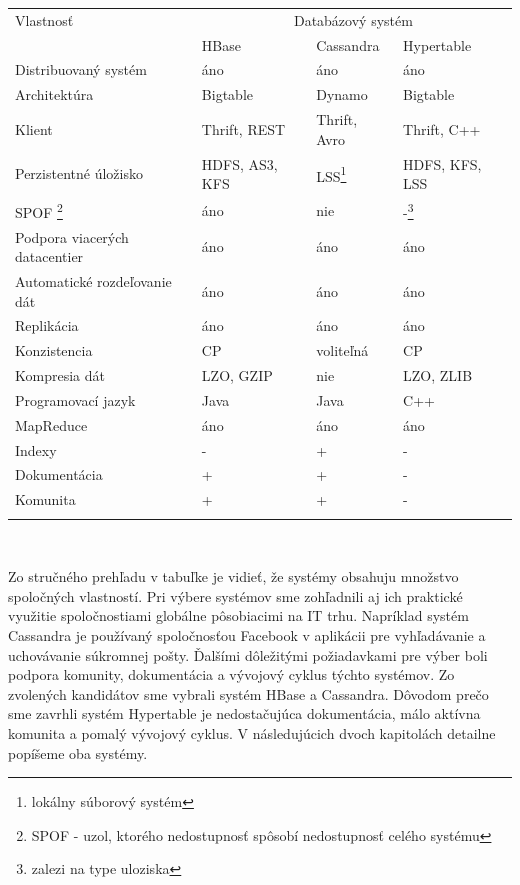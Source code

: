 \documentclass[11pt,twoside,a4paper]{book}
\begin{document}
{\centering\par\bigskip
\begin{tabular}{l@{\hspace{2.5em}}lll}\toprule
Vlastnosť & \multicolumn{3}{c}{Databázový systém} \\
			& \multicolumn{1}{l}{HBase} & \multicolumn{1}{l}{Cassandra} & \multicolumn{1}{l}{Hypertable}\\\midrule\addlinespace

Distribuovaný systém	& áno  & áno & áno 				\\\addlinespace
Architektúra		& Bigtable  & Dynamo & Bigtable	\\\addlinespace
Klient 			& Thrift, REST  & Thrift, Avro & Thrift, C++ 	\\\addlinespace
Perzistentné úložisko	& HDFS, AS3, KFS  & LSS\footnote{lokálny súborový systém} & HDFS, KFS, LSS		\\\addlinespace
SPOF \footnote{SPOF - uzol, ktorého nedostupnosť spôsobí nedostupnosť celého systému}	& áno  & nie & -\footnote{zalezi na type uloziska} 	\\\addlinespace
Podpora viacerých datacentier & áno  & áno & áno 			\\\addlinespace
Automatické rozdeľovanie dát 	& áno  & áno & áno 			\\\addlinespace
Replikácia 		& áno  & áno & áno 				\\\addlinespace
Konzistencia 		& CP  & voliteľná & CP 				\\\addlinespace
Kompresia dát		& LZO, GZIP  & nie & LZO, ZLIB 				\\\addlinespace
Programovací jazyk 	& Java  & Java & C++ 				\\\addlinespace
MapReduce 		& áno  & áno & áno 				\\\addlinespace
Indexy		 	& -  & +  & - 					\\\addlinespace
Dokumentácia		& +  & +  & - 					\\\addlinespace
Komunita 		& +  & +  & - 					\\\addlinespace\bottomrule

\end{tabular}\\}
\label{tab:Nosql}
\par\bigskip



Zo stručného prehľadu v tabuľke je vidieť, že systémy obsahuju množstvo spoločných vlastností. Pri výbere systémov sme zohľadnili aj ich praktické využitie spoločnostiami globálne pôsobiacimi na IT trhu. Napríklad systém Cassandra je používaný spoločnosťou Facebook v aplikácii pre vyhľadávanie a uchovávanie súkromnej pošty. Ďalšími dôležitými požiadavkami pre výber boli podpora komunity, dokumentácia a vývojový cyklus týchto systémov. Zo zvolených kandidátov sme vybrali systém HBase a Cassandra. Dôvodom prečo sme zavrhli systém Hypertable je nedostačujúca dokumentácia, málo aktívna komunita a pomalý vývojový cyklus. V následujúcich dvoch kapitolách detailne popíšeme oba systémy.
\end{document}
